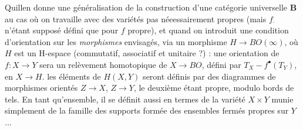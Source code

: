 \documentclass[11pt,a4paper]{article}
\begin{document}

Quillen donne une généralisation de la construction d'une catégorie
universelle $\mathbf{B}$ au cas où on travaille avec des variétés pas
néeessairement propres (mais $f_{\cdot}$ n'étant supposé défini que pour $f$
propre), et quand on introduit une condition d'orientation  sur
les \emph{morphismes} envisagés, via un morphisme $H \to BO(\infty)$, où $H$
est un H-espace (commutatif, associatif et unitaire ?) : une orientation de $f
: X \to Y$ sera un relèvement homotopique de $X \to BO$, défini par $T_{X} -
f^{\bullet}(T_{Y})$, en $X \to H$. les éléments de $H(X, Y)$ seront définis par des
diagrammes de morphismes orientés $Z \to X$, $Z \to Y$, le deuxième étant
propre, modulo bords de tels. En tant qu'ensemble, il se définit aussi en
termes de la variété $X \times Y$ munie simplement de la famille des supports
formée des ensembles fermés propres sur $Y$ ...


\end{document}
